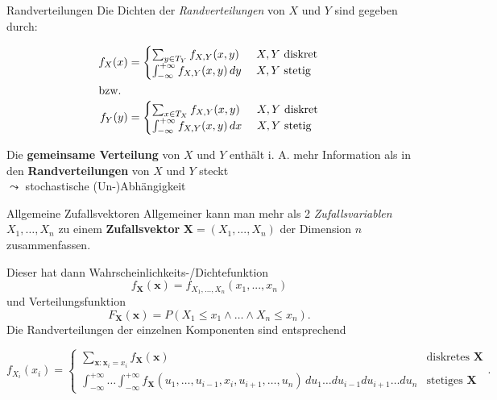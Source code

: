 \documentclass[
  10pt,
  ignorenonframetext,
]{beamer}
\begin{document}
\begin{frame}{Randverteilungen}
\label{randverteilungen}
Die Dichten der \emph{Randverteilungen} von \(X\) und \(Y\) sind gegeben
durch:

\begin{align*}
f_X(x) &= \begin{cases} \sum_{y \in T_Y} f_{X,Y}(x,y) & \text{ $X, Y$ diskret} \\
                      \int_{-\infty}^{+\infty} f_{X,Y}(x,y)\,dy & \text{ $X, Y$ stetig} 
                      \end{cases} \\
\intertext{bzw.}
f_Y(y) &= \begin{cases} \sum_{x \in T_X} f_{X,Y}(x,y) & \text{ $X, Y$ diskret} \\
                      \int_{-\infty}^{+\infty} f_{X,Y}(x,y)\,dx & \text{ $X, Y$ stetig} 
                      \end{cases}
\end{align*}

Die \textbf{gemeinsame Verteilung} von \(X\) und \(Y\) enthält i. A.
mehr Information als in den \textbf{Randverteilungen} von \(X\) und
\(Y\) steckt\\
\(\leadsto\) stochastische (Un-)Abhängigkeit
\end{frame}

\begin{frame}{Allgemeine Zufallsvektoren}
\label{allgemeine-zufallsvektoren}
Allgemeiner kann man mehr als 2 \emph{Zufallsvariablen}
\(X_1, \dots, X_n\) zu einem \textbf{Zufallsvektor}
\(\symbf{X}=(X_1, ..., X_n)\) der Dimension \(n\) zusammenfassen.

Dieser hat dann Wahrscheinlichkeits-/Dichtefunktion \[
f_{\symbf{X}}(\symbf{x}) = f_{X_1,..., X_n}(x_1, ..., x_n)
\] und Verteilungsfunktion \[
F_{\symbf{X}}(\symbf{x}) = P(X_1 \leq x_1 \land \dots \land X_n \leq x_n) .
\] Die Randverteilungen der einzelnen Komponenten sind entsprechend

\begin{small}
$$
f_{X_i}(x_i)  =  \begin{cases} \sum_{\symbf{x}: \symbf{x}_i = x_i} f_{\symbf{X}}(\symbf{x}) & \text{diskretes } \symbf{X} \\
 \int_{-\infty}^{+\infty}\dots\int_{-\infty}^{+\infty}f_{\symbf{X}}(u_1, \dots, u_{i-1}, x_i, u_{i+1}, \dots, u_n) \,du_1  \dots d u_{i-1} d u_{i+1} \dots du_n & \text{stetiges } \symbf{X}
 \end{cases} .
$$
\end{small}
\end{frame}
\end{document}
